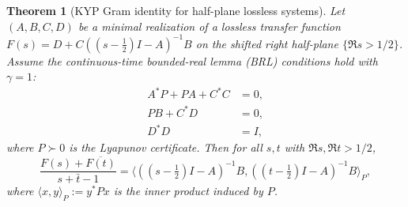\documentclass[11pt]{article}
\newtheorem{theorem}{Theorem}
\theoremstyle{definition}
\theoremstyle{remark}
\begin{document}
\begin{theorem}[KYP Gram identity for half-plane lossless systems]\label{thm:KYP-gram-appendix}
Let $(A, B, C, D)$ be a minimal realization of a lossless transfer function $F(s) = D + C((s-\tfrac12)I - A)^{-1}B$ on the shifted right half-plane $\{\Re s > 1/2\}$. Assume the continuous-time bounded-real lemma (BRL) conditions hold with $\gamma = 1$:
\begin{align}
  A^* P + P A + C^* C &= 0, \label{eq:brl1}\\
  P B + C^* D &= 0, \label{eq:brl2}\\
  D^* D &= I, \label{eq:brl3}
\end{align}
where $P \succ 0$ is the Lyapunov certificate. Then for all $s, t$ with $\Re s, \Re t > 1/2$,
\[
  \frac{F(s) + \overline{F(t)}}{s + \bar t - 1} = \langle ((s-\tfrac12)I - A)^{-1}B, ((t-\tfrac12)I - A)^{-1}B \rangle_P,
\]
where $\langle x, y \rangle_P := y^* P x$ is the inner product induced by $P$.
\end{theorem}
\end{document}
